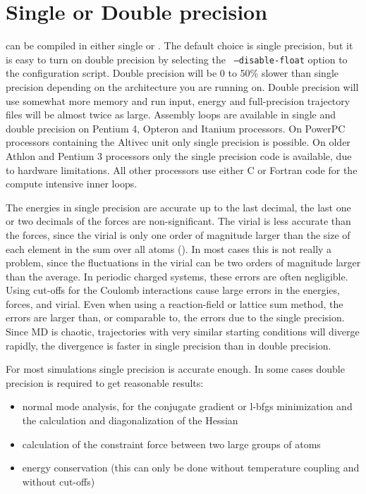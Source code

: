 \section{Single or Double precision}
{\gromacs} can be compiled in either single or
. The default choice is single precision,
but it is easy to turn on double precision by selecting the {\tt
--disable-float} option to the configuration script.  Double precision
will be 0 to 50\% slower than single precision depending on the
architecture you are running on. Double precision will use somewhat
more memory and run input, energy and full-precision trajectory files
will be almost twice as large.  Assembly loops are available in single
and double precision on Pentium 4, Opteron and Itanium processors.  On
PowerPC processors containing the Altivec unit only single precision
is possible. On older Athlon and Pentium 3 processors only the single
precision code is available, due to hardware limitations. All other
processors use either C or Fortran code for the compute intensive
inner loops.

The energies in single precision are accurate up to the last decimal,
the last one or two decimals of the forces are non-significant.
The virial is less accurate than the forces, since the virial is only one
order of magnitude larger than the size of each element in the sum over
all atoms ().
In most cases this is not really a problem, since the fluctuations in the
virial can be two orders of magnitude larger than the average.
In periodic charged systems, these errors are often negligible.
Using cut-offs for the Coulomb interactions cause large errors
in the energies, forces, and virial.
Even when using a reaction-field or lattice sum method, the errors
are larger than, or comparable to, the errors due to the single precision.
Since MD is chaotic, trajectories with very similar starting conditions will
diverge rapidly, the divergence is faster in single precision than in double
precision.

For most simulations single precision is accurate enough.
In some cases double precision is required to get reasonable results:
\begin{itemize}
\item normal mode analysis,
for the conjugate gradient or l-bfgs minimization and the calculation and
diagonalization of the Hessian
\item calculation of the constraint force between two large groups of atoms
\item energy conservation (this can only be done without temperature coupling
and without cut-offs)
\end{itemize}

